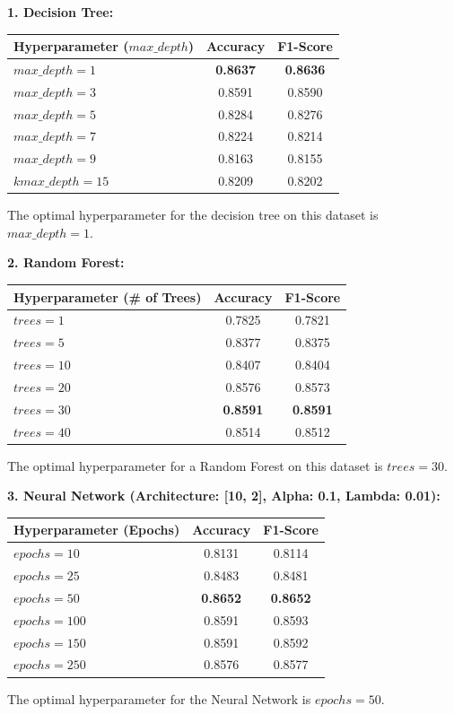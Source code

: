 \documentclass{article}
\begin{document}
\textbf{1. Decision Tree:}
\begin{table}[H]
\centering
\begin{tabular}{|l|c|c|}
\hline
\textbf{Hyperparameter ($max\_depth$)} & \textbf{Accuracy} & \textbf{F1-Score} \\ \hline
$max\_depth = 1$ & \textbf{0.8637} & \textbf{0.8636} \\ \hline
$max\_depth = 3$ & 0.8591 & 0.8590 \\ \hline
$max\_depth = 5$ & 0.8284 & 0.8276 \\ \hline
$max\_depth = 7$ & 0.8224 & 0.8214 \\ \hline
$max\_depth = 9$ & 0.8163 & 0.8155 \\ \hline
$kmax\_depth = 15$ & 0.8209 & 0.8202 \\ \hline
\end{tabular}
\end{table}
\noindent The optimal hyperparameter for the decision tree on this dataset is $max\_depth = 1$.
\vspace{0.25cm}

\textbf{2. Random Forest:}
\begin{table}[H]
\centering
\begin{tabular}{|l|c|c|}
\hline
\textbf{Hyperparameter (\# of Trees)} & \textbf{Accuracy} & \textbf{F1-Score} \\ \hline
$trees = 1$ & 0.7825 & 0.7821 \\ \hline
$trees = 5$ & 0.8377 & 0.8375 \\ \hline
$trees = 10$ & 0.8407 & 0.8404 \\ \hline
$trees = 20$ & 0.8576 & 0.8573 \\ \hline
$trees = 30$ & \textbf{0.8591} & \textbf{0.8591} \\ \hline
$trees = 40$ & 0.8514 & 0.8512 \\ \hline
\end{tabular}
\end{table}
\noindent The optimal hyperparameter for a Random Forest on this dataset is $trees=30$.
\vspace{0.25cm}

\textbf{3. Neural Network (Architecture: [10, 2], Alpha: 0.1, Lambda: 0.01):}
\begin{table}[H]
\centering
\begin{tabular}{|l|c|c|}
\hline
\textbf{Hyperparameter (Epochs)} & \textbf{Accuracy} & \textbf{F1-Score} \\ \hline
$epochs = 10$ & 0.8131 & 0.8114 \\ \hline
$epochs = 25$ & 0.8483 & 0.8481 \\ \hline
$epochs = 50$ & \textbf{0.8652} & \textbf{0.8652} \\ \hline
$epochs = 100$ & 0.8591 & 0.8593 \\ \hline
$epochs = 150$ & 0.8591 & 0.8592 \\ \hline
$epochs = 250$ & 0.8576 & 0.8577 \\ \hline
\end{tabular}
\end{table}
\noindent The optimal hyperparameter for the Neural Network is $epochs=50$.
\end{document}
